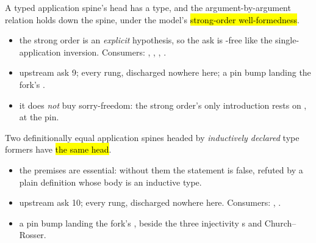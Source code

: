 \begin{assumption}
\label{asm:UpstreamAsks-mkAppsInv}
\leanok
{}
\stAssumed{}  A typed application spine's head has a type, and the
argument-by-argument  relation holds down the spine, under the model's \hl{strong-order
well-formedness}.
\begin{itemize}
\item {} the strong order is an \emph{explicit} hypothesis, so the ask is
-free like the single-application inversion. Consumers: ,
, , .
\item {} upstream ask 9;  every rung, discharged nowhere here;
 a pin bump landing the fork's .
\item {} it does \emph{not} buy sorry-freedom: the strong order's only introduction
rests on ,  at the pin.
\end{itemize}
\end{assumption}

\begin{assumption}
\label{asm:UpstreamAsks-indSpineInj}
\leanok
{}
\stAssumed{}  Two definitionally equal application spines headed by
\emph{inductively declared} type formers have \hl{the same head}.
\begin{itemize}
\item {} the  premises are essential: without them the statement is
false, refuted by a plain definition whose body is an inductive type.
\item {} upstream ask 10;  every rung, discharged nowhere here.
Consumers: , .
\item {} a pin bump landing the fork's ,
beside the three injectivity s and Church--Rosser.
\end{itemize}
\end{assumption}

